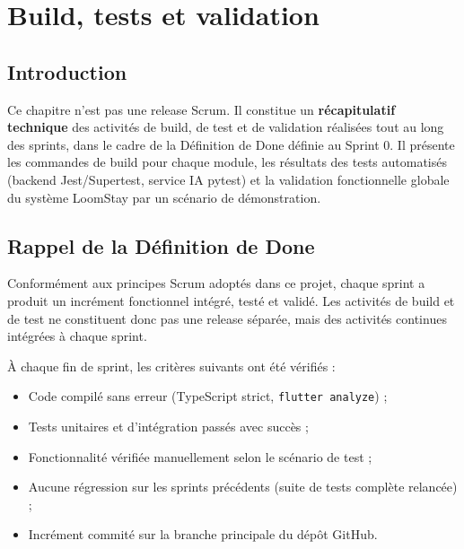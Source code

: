
\chapter{Build, tests et validation}
\label{chap:build_tests}

\section*{Introduction}

Ce chapitre n'est pas une release Scrum. Il constitue un \textbf{récapitulatif technique} des activités de build, de test et de validation réalisées tout au long des sprints, dans le cadre de la Définition de Done définie au Sprint 0. Il présente les commandes de build pour chaque module, les résultats des tests automatisés (backend Jest/Supertest, service IA pytest) et la validation fonctionnelle globale du système LoomStay par un scénario de démonstration.

\section{Rappel de la Définition de Done}
\label{sec:rappel_dod}

Conformément aux principes Scrum adoptés dans ce projet, chaque sprint a produit un incrément fonctionnel intégré, testé et validé. Les activités de build et de test ne constituent donc pas une release séparée, mais des activités continues intégrées à chaque sprint.

À chaque fin de sprint, les critères suivants ont été vérifiés :
\begin{itemize}
  \item Code compilé sans erreur (TypeScript strict, \texttt{flutter analyze}) ;
  \item Tests unitaires et d'intégration passés avec succès ;
  \item Fonctionnalité vérifiée manuellement selon le scénario de test ;
  \item Aucune régression sur les sprints précédents (suite de tests complète relancée) ;
  \item Incrément commité sur la branche principale du dépôt GitHub.
\end{itemize}

